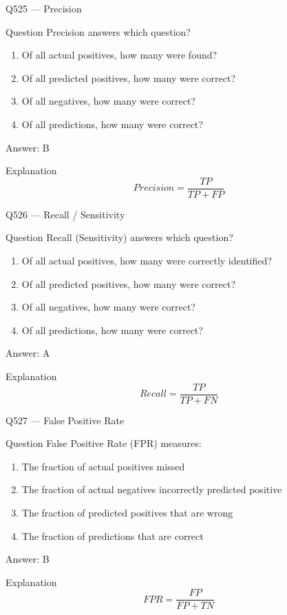 \documentclass[aspectratio=169,8pt]{beamer}
\begin{document}
\begin{frame}{Q525 --- Precision}
	\begin{block}{Question}
		Precision answers which question?
		\begin{enumerate}
			\item Of all actual positives, how many were found?
			\item Of all predicted positives, how many were correct?
			\item Of all negatives, how many were correct?
			\item Of all predictions, how many were correct?
		\end{enumerate}
	\end{block}
	\begin{exampleblock}{Answer: B}\end{exampleblock}
	\begin{block}{Explanation}
		\[
		Precision = \frac{TP}{TP+FP}
		\]
	\end{block}
\end{frame}

\begin{frame}{Q526 --- Recall / Sensitivity}
	\begin{block}{Question}
		Recall (Sensitivity) answers which question?
		\begin{enumerate}
			\item Of all actual positives, how many were correctly identified?
			\item Of all predicted positives, how many were correct?
			\item Of all negatives, how many were correct?
			\item Of all predictions, how many were correct?
		\end{enumerate}
	\end{block}
	\begin{exampleblock}{Answer: A}\end{exampleblock}
	\begin{block}{Explanation}
		\[
		Recall = \frac{TP}{TP+FN}
		\]
	\end{block}
\end{frame}

\begin{frame}{Q527 --- False Positive Rate}
	\begin{block}{Question}
		False Positive Rate (FPR) measures:
		\begin{enumerate}
			\item The fraction of actual positives missed
			\item The fraction of actual negatives incorrectly predicted positive
			\item The fraction of predicted positives that are wrong
			\item The fraction of predictions that are correct
		\end{enumerate}
	\end{block}
	\begin{exampleblock}{Answer: B}\end{exampleblock}
	\begin{block}{Explanation}
		\[
		FPR=\frac{FP}{FP+TN}
		\]
	\end{block}
\end{frame}
\end{document}
